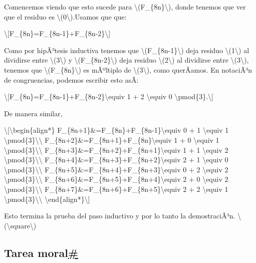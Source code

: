 Comencemos viendo que esto sucede para
{\textbackslash(F\_\{8n\}\textbackslash)}, donde tenemos que ver que el
residuo es {\textbackslash(0\textbackslash)}.Usamos que que:

\textbackslash{[}F\_\{8n\}=F\_\{8n-1\}+F\_\{8n-2\}\textbackslash{]}

Como por hipÃ³tesis inductiva tenemos que
{\textbackslash(F\_\{8n-1\}\textbackslash)} deja residuo
{\textbackslash(1\textbackslash)} al dividirse entre
{\textbackslash(3\textbackslash)} y
{\textbackslash(F\_\{8n-2\}\textbackslash)} deja residuo
{\textbackslash(2\textbackslash)} al dividirse entre
{\textbackslash(3\textbackslash)}, tenemos que
{\textbackslash(F\_\{8n\}\textbackslash)} es mÃºltiplo de
{\textbackslash(3\textbackslash)}, como querÃ­amos. En notaciÃ³n de
congruencias, podemos escribir esto asÃ­:

\textbackslash{[}F\_\{8n\}=F\_\{8n-1\}+F\_\{8n-2\}\textbackslash equiv 1
+ 2 \textbackslash equiv 0 \textbackslash pmod\{3\}.\textbackslash{]}

De manera similar,

\textbackslash{[}\textbackslash begin\{align*\}
F\_\{8n+1\}\&=F\_\{8n\}+F\_\{8n-1\}\textbackslash equiv 0 + 1
\textbackslash equiv 1
\textbackslash pmod\{3\}\textbackslash\textbackslash{}
F\_\{8n+2\}\&=F\_\{8n+1\}+F\_\{8n\}\textbackslash equiv 1 + 0
\textbackslash equiv 1
\textbackslash pmod\{3\}\textbackslash\textbackslash{}
F\_\{8n+3\}\&=F\_\{8n+2\}+F\_\{8n+1\}\textbackslash equiv 1 + 1
\textbackslash equiv 2
\textbackslash pmod\{3\}\textbackslash\textbackslash{}
F\_\{8n+4\}\&=F\_\{8n+3\}+F\_\{8n+2\}\textbackslash equiv 2 + 1
\textbackslash equiv 0
\textbackslash pmod\{3\}\textbackslash\textbackslash{}
F\_\{8n+5\}\&=F\_\{8n+4\}+F\_\{8n+3\}\textbackslash equiv 0 + 2
\textbackslash equiv 2
\textbackslash pmod\{3\}\textbackslash\textbackslash{}
F\_\{8n+6\}\&=F\_\{8n+5\}+F\_\{8n+4\}\textbackslash equiv 2 + 0
\textbackslash equiv 2
\textbackslash pmod\{3\}\textbackslash\textbackslash{}
F\_\{8n+7\}\&=F\_\{8n+6\}+F\_\{8n+5\}\textbackslash equiv 2 + 2
\textbackslash equiv 1
\textbackslash pmod\{3\}\textbackslash\textbackslash{}
\textbackslash end\{align*\}\textbackslash{]}

Esto termina la prueba del paso inductivo y por lo tanto la
demostraciÃ³n. {{\textbackslash(\textbackslash square\textbackslash)}}

\subsection{\texorpdfstring{Tarea
moral\hyperref[tarea-moral]{\#}}{Tarea moral\#}}\label{tarea-moral}

